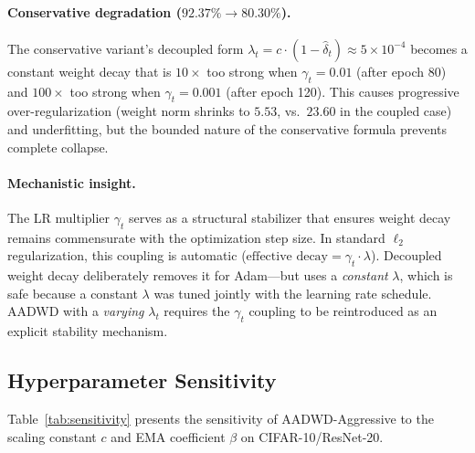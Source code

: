 \documentclass{article}
\begin{document}
\paragraph{Conservative degradation ($92.37\% \to 80.30\%$).}
The conservative variant's decoupled form
$\lambda_t = c \cdot (1 - \hat{\delta}_t) \approx 5 \times 10^{-4}$
becomes a constant weight decay that is $10\times$ too strong when
$\gamma_t = 0.01$ (after epoch 80) and $100\times$ too strong when
$\gamma_t = 0.001$ (after epoch 120).
This causes progressive over-regularization (weight norm shrinks to $5.53$, vs.\
$23.60$ in the coupled case) and underfitting, but the bounded nature of the
conservative formula prevents complete collapse.

\paragraph{Mechanistic insight.}
The LR multiplier $\gamma_t$ serves as a structural stabilizer that ensures weight
decay remains commensurate with the optimization step size.
In standard $\ell_2$ regularization, this coupling is automatic
($\text{effective decay} = \gamma_t \cdot \lambda$).
Decoupled weight decay \citep{loshchilov2019decoupled} deliberately removes it for
Adam---but uses a \emph{constant} $\lambda$, which is safe because a constant
$\lambda$ was tuned jointly with the learning rate schedule.
AADWD with a \emph{varying} $\lambda_t$ requires the $\gamma_t$ coupling to be
reintroduced as an explicit stability mechanism.

\subsection{Hyperparameter Sensitivity}
\label{sec:sensitivity}

Table~\ref{tab:sensitivity} presents the sensitivity of AADWD-Aggressive to the
scaling constant $c$ and EMA coefficient $\beta$ on CIFAR-10/ResNet-20.
\end{document}
